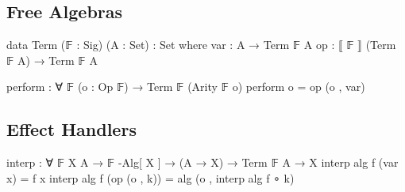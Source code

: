 \subsection{Free Algebras}

\begin{center}\begin{code}
data Term (𝔽 : Sig) (A : Set) : Set where
  var : A → Term 𝔽 A
  op : ⟦ 𝔽 ⟧ (Term 𝔽 A) → Term 𝔽 A

perform : ∀ {𝔽} (o : Op 𝔽) → Term 𝔽 (Arity 𝔽 o)
perform o = op (o , var)
\end{code}\end{center}

\subsection{Effect Handlers}

\begin{center}\begin{code}
interp : ∀ {𝔽} {X A} → 𝔽 -Alg[ X ] → (A → X) → Term 𝔽 A → X
interp alg f (var x)      = f x
interp alg f (op (o , k)) = alg (o , interp alg f ∘ k)
\end{code}\end{center}
